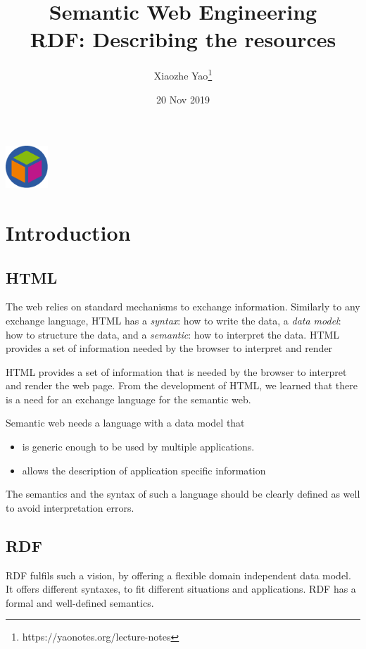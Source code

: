 \documentclass{article}
\title{Semantic Web Engineering \protect\\ RDF: Describing the resources}
\author{Xiaozhe Yao\footnote{https://yaonotes.org/lecture-notes}}
\date{20 Nov 2019}
\theoremstyle{definition}
\begin{document}
\maketitle
\begin{center}
    \includegraphics[width=60px]{Semantic_Web/images/semantic-web.pdf}
\end{center}
\section{Introduction}

\subsection{HTML}

The web relies on standard mechanisms to exchange information. Similarly to any exchange language, HTML has a \textit{syntax}: how to write the data, a \textit{data model}: how to structure the data, and a \textit{semantic}: how to interpret the data. HTML provides a set of information needed by the browser to interpret and render 

HTML provides a set of information that is needed by the browser to interpret and render the web page. From the development of HTML, we learned that there is a need for an exchange language for the semantic web.

Semantic web needs a language with a data model that 
\begin{itemize}
    \item is generic enough to be used by multiple applications.
    \item allows the description of application specific information
\end{itemize}

The semantics and the syntax of such a language should be clearly defined as well to avoid interpretation errors.

\subsection{RDF}

RDF fulfils such a vision, by offering a flexible domain independent data model. It offers different syntaxes, to fit different situations and applications. RDF has a formal and well-defined semantics.
\end{document}
